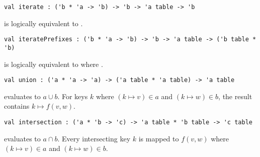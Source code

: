 \begin{cluster}
\label{grp:grm:ordtable-interface::iterate}

\begin{gram}[iterate]
\label{grm:ordtable-interface::iterate}
\begin{verbatim}
val iterate : ('b * 'a -> 'b) -> 'b -> 'a table -> 'b
\end{verbatim}
 is logically equivalent to .

\end{gram}
\end{cluster}

\begin{cluster}
\label{grp:grm:ordtable-interface::iterateprefixes}

\begin{gram}[iteratePrefixes]
\label{grm:ordtable-interface::iterateprefixes}
\begin{verbatim}
val iteratePrefixes : ('b * 'a -> 'b) -> 'b -> 'a table -> ('b table * 'b)
\end{verbatim}
 is logically equivalent to
 where .

\end{gram}
\end{cluster}

\begin{cluster}
\label{grp:grm:ordtable-interface::union}

\begin{gram}[union]
\label{grm:ordtable-interface::union}
\begin{verbatim}
val union : ('a * 'a -> 'a) -> ('a table * 'a table) -> 'a table
\end{verbatim}
 evaluates to $a \cup b$. For keys $k$ where $(k \mapsto v) \in a$
and $(k \mapsto w) \in b$, the result contains $k \mapsto f(v,w)$.

\end{gram}
\end{cluster}

\begin{cluster}
\label{grp:grm:ordtable-interface::intersection}

\begin{gram}[intersection]
\label{grm:ordtable-interface::intersection}
\begin{verbatim}
val intersection : ('a * 'b -> 'c) -> 'a table * 'b table -> 'c table
\end{verbatim}
 evaluates to $a \cap b$. Every intersecting key
$k$ is mapped to $f(v,w)$ where $(k \mapsto v) \in a$ and $(k \mapsto w) \in b$.

\end{gram}
\end{cluster}

